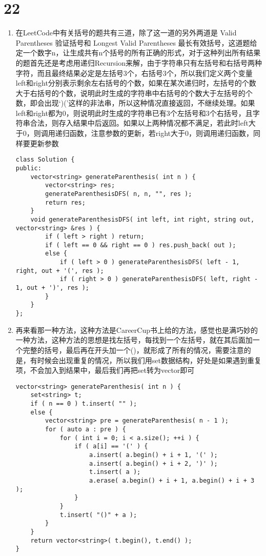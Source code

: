 \documentclass[12pt,a4paper]{article}
\begin{document}
\section{22}
\begin{enumerate}
\item
\begin{CJK}{UTF8}{gbsn}
在LeetCode中有关括号的题共有三道，除了这一道的另外两道是 Valid Parentheses 验证括号和 Longest Valid Parentheses 最长有效括号，这道题给定一个数字n，让生成共有n个括号的所有正确的形式，对于这种列出所有结果的题首先还是考虑用递归Recursion来解，由于字符串只有左括号和右括号两种字符，而且最终结果必定是左括号3个，右括号3个，所以我们定义两个变量left和right分别表示剩余左右括号的个数，如果在某次递归时，左括号的个数大于右括号的个数，说明此时生成的字符串中右括号的个数大于左括号的个数，即会出现`)('这样的非法串，所以这种情况直接返回，不继续处理。如果left和right都为0，则说明此时生成的字符串已有3个左括号和3个右括号，且字符串合法，则存入结果中后返回。如果以上两种情况都不满足，若此时left大于0，则调用递归函数，注意参数的更新，若right大于0，则调用递归函数，同样要更新参数
\end{CJK}
\begin{lstlisting}
class Solution {
public:
	vector<string> generateParenthesis( int n ) {
		vector<string> res;
		generateParenthesisDFS( n, n, "", res );
		return res;
	}
	void generateParenthesisDFS( int left, int right, string out, vector<string> &res ) {
		if ( left > right ) return;
		if ( left == 0 && right == 0 ) res.push_back( out );
		else {
			if ( left > 0 ) generateParenthesisDFS( left - 1, right, out + '(', res );
			if ( right > 0 ) generateParenthesisDFS( left, right - 1, out + ')', res );
		}
	}
};
\end{lstlisting}
\item
\begin{CJK}{UTF8}{gbsn}
再来看那一种方法，这种方法是CareerCup书上给的方法，感觉也是满巧妙的一种方法，这种方法的思想是找左括号，每找到一个左括号，就在其后面加一个完整的括号，最后再在开头加一个()，就形成了所有的情况，需要注意的是，有时候会出现重复的情况，所以我们用set数据结构，好处是如果遇到重复项，不会加入到结果中，最后我们再把set转为vector即可
\end{CJK}
\begin{lstlisting}
vector<string> generateParenthesis( int n ) {
	set<string> t;
	if ( n == 0 ) t.insert( "" );
	else {
		vector<string> pre = generateParenthesis( n - 1 );
		for ( auto a : pre ) {
			for ( int i = 0; i < a.size(); ++i ) {
				if ( a[i] == '(' ) {
					a.insert( a.begin() + i + 1, '(' );
					a.insert( a.begin() + i + 2, ')' );
					t.insert( a );
					a.erase( a.begin() + i + 1, a.begin() + i + 3 );
				}
			}
			t.insert( "()" + a );
		}
	}
	return vector<string>( t.begin(), t.end() );
}
\end{lstlisting}
\end{enumerate}
\end{document}
